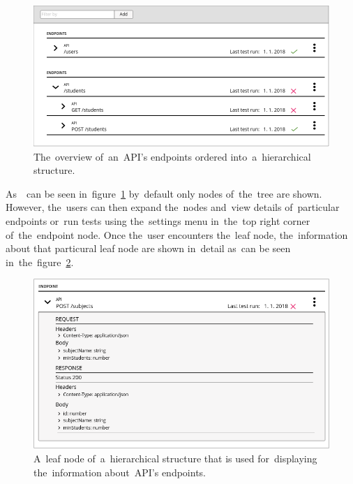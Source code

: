\begin{figure}[!hbt]
	\centering
	\includegraphics[scale=0.4]{./designs/drafts-1.0/api-general.png}
	\caption{The~overview of~an~API's endpoints ordered into~a~hierarchical
	 structure.}
	\label{api-general}
\end{figure}

As~~can be seen in~figure~\ref{api-general} by~default only  nodes
of~the~tree are shown. However, the~users can then expand the~nodes and~view
details of~particular endpoints or~run tests using the~settings menu in~the~top
right corner of~the~endpoint node. Once the~user encounters the~leaf node,
the~information about that particural leaf node are shown in~detail as~can be
seen in~the~figure~\ref{api-detail}.

\begin{figure}[!hbt]
	\centering
	\includegraphics[scale=0.4]{./designs/drafts-1.0/api-detail.png}
	\caption{A~leaf node of~a~hierarchical structure that is used for~displaying
	the~information about~API's endpoints.}
	\label{api-detail}
\end{figure}

